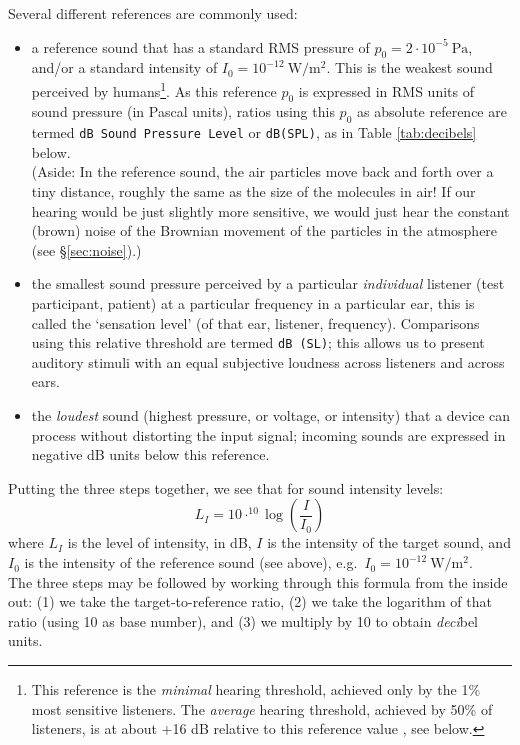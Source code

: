 \documentclass[
]{book}
\begin{document}
Several different references are commonly used:

\begin{itemize}
\item
  a reference sound that has a standard RMS pressure of \(p_0 = 2 \cdot 10^{-5}\ \textrm{Pa}\), and/or a standard intensity of \(I_0 = 10^{-12}\ \textrm{W}/\textrm{m}^2\). This is the weakest sound perceived by humans\footnote{This reference is the \emph{minimal} hearing threshold, achieved only by the 1\% most sensitive listeners. The \emph{average} hearing threshold, achieved by 50\% of listeners, is at about +16 dB relative to this reference value \citep[Fig.96]{Fletcher_1953}, see below.}.
  As this reference \(p_0\) is expressed in RMS units of sound pressure (in Pascal units), ratios using this \(p_0\) as absolute reference are termed \texttt{dB\ Sound\ Pressure\ Level} or \texttt{dB(SPL)}, as in Table \ref{tab:decibels} below.\\
  (Aside: In the reference sound, the air particles move back and forth over a tiny distance, roughly the same as the size of the molecules in air! If our hearing would be just slightly more sensitive, we would just hear the constant (brown) noise of the Brownian movement of the particles in the atmosphere (see §\ref{sec:noise}).)
\item
  the smallest sound pressure perceived by a particular \emph{individual} listener (test participant, patient) at a particular frequency in a particular ear, this is called the `sensation level' (of that ear, listener, frequency). Comparisons using this relative threshold are termed \texttt{dB\ (SL)}; this allows us to present auditory stimuli with an equal subjective loudness across listeners and across ears.
\item
  the \emph{loudest} sound (highest pressure, or voltage, or intensity) that a device can process without distorting the input signal; incoming sounds are expressed in negative dB units below this reference.
\end{itemize}

Putting the three steps together, we see that for sound intensity levels:
\[L_I = 10 \cdot ^{10}\log \left( \frac{I}{I_0} \right)\]
where \(L_I\) is the level of intensity, in dB, \(I\) is the intensity of the target sound, and \(I_0\) is the intensity of the reference sound (see above), e.g.~\(I_0 = 10^{-12}\ \textrm{W}/\textrm{m}^2\).\\
The three steps may be followed by working through this formula from the inside out: (1) we take the target-to-reference ratio, (2) we take the logarithm of that ratio (using 10 as base number), and (3) we multiply by 10 to obtain \emph{deci}bel units.
\end{document}
